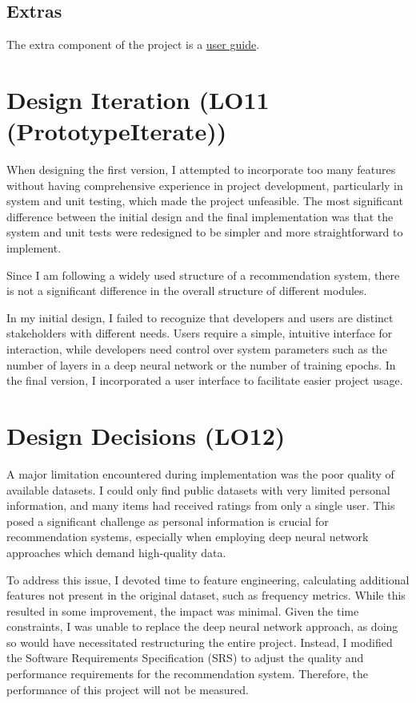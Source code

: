 \documentclass{article}
\begin{document}
\subsection{Extras}

The extra component of the project is a \href{https://github.com/V-AS/Two-tower-recommender-system/blob/main/docs/Extras/UserManual/UserManual.pdf}{user guide}.

\section{Design Iteration (LO11 (PrototypeIterate))}

When designing the first version, I attempted to incorporate too many features without having comprehensive experience in project development, particularly in system and unit testing, which made the project unfeasible. The most significant difference between the initial design and the final implementation was that the system and unit tests were redesigned to be simpler and more straightforward to implement.

Since I am following a widely used structure of a recommendation system, there is not a significant difference in the overall structure of different modules.

In my initial design, I failed to recognize that developers and users are distinct stakeholders with different needs. Users require a simple, intuitive interface for interaction, while developers need control over system parameters such as the number of layers in a deep neural network or the number of training epochs. In the final version, I incorporated a user interface to facilitate easier project usage.

\section{Design Decisions (LO12)}

A major limitation encountered during implementation was the poor quality of available datasets. I could only find public datasets with very limited personal information, and many items had received ratings from only a single user. This posed a significant challenge as personal information is crucial for recommendation systems, especially when employing deep neural network approaches which demand high-quality data.

To address this issue, I devoted time to feature engineering, calculating additional features not present in the original dataset, such as frequency metrics. While this resulted in some improvement, the impact was minimal. Given the time constraints, I was unable to replace the deep neural network approach, as doing so would have necessitated restructuring the entire project. Instead, I modified the Software Requirements Specification (SRS) to adjust the quality and performance requirements for the recommendation system. Therefore, the performance of this project will not be measured.
\end{document}
